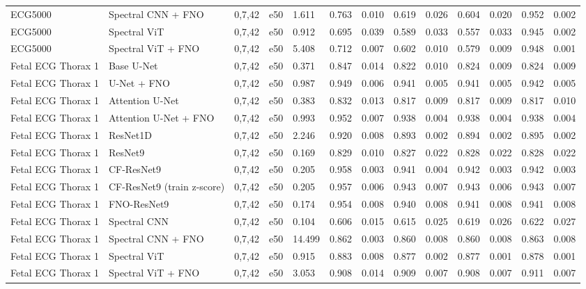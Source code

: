 \begin{longtable}{lllllllllllll}
ECG5000 & Spectral CNN + FNO & 0,7,42 & e50 & 1.611 & 0.763 & 0.010 & 0.619 & 0.026 & 0.604 & 0.020 & 0.952 & 0.002 \\
ECG5000 & Spectral ViT & 0,7,42 & e50 & 0.912 & 0.695 & 0.039 & 0.589 & 0.033 & 0.557 & 0.033 & 0.945 & 0.002 \\
ECG5000 & Spectral ViT + FNO & 0,7,42 & e50 & 5.408 & 0.712 & 0.007 & 0.602 & 0.010 & 0.579 & 0.009 & 0.948 & 0.001 \\
Fetal ECG Thorax 1 & Base U-Net & 0,7,42 & e50 & 0.371 & 0.847 & 0.014 & 0.822 & 0.010 & 0.824 & 0.009 & 0.824 & 0.009 \\
Fetal ECG Thorax 1 & U-Net + FNO & 0,7,42 & e50 & 0.987 & 0.949 & 0.006 & 0.941 & 0.005 & 0.941 & 0.005 & 0.942 & 0.005 \\
Fetal ECG Thorax 1 & Attention U-Net & 0,7,42 & e50 & 0.383 & 0.832 & 0.013 & 0.817 & 0.009 & 0.817 & 0.009 & 0.817 & 0.010 \\
Fetal ECG Thorax 1 & Attention U-Net + FNO & 0,7,42 & e50 & 0.993 & 0.952 & 0.007 & 0.938 & 0.004 & 0.938 & 0.004 & 0.938 & 0.004 \\
Fetal ECG Thorax 1 & ResNet1D & 0,7,42 & e50 & 2.246 & 0.920 & 0.008 & 0.893 & 0.002 & 0.894 & 0.002 & 0.895 & 0.002 \\
Fetal ECG Thorax 1 & ResNet9 & 0,7,42 & e50 & 0.169 & 0.829 & 0.010 & 0.827 & 0.022 & 0.828 & 0.022 & 0.828 & 0.022 \\
Fetal ECG Thorax 1 & CF-ResNet9 & 0,7,42 & e50 & 0.205 & 0.958 & 0.003 & 0.941 & 0.004 & 0.942 & 0.003 & 0.942 & 0.003 \\
Fetal ECG Thorax 1 & CF-ResNet9 (train z-score) & 0,7,42 & e50 & 0.205 & 0.957 & 0.006 & 0.943 & 0.007 & 0.943 & 0.006 & 0.943 & 0.007 \\
Fetal ECG Thorax 1 & FNO-ResNet9 & 0,7,42 & e50 & 0.174 & 0.954 & 0.008 & 0.940 & 0.008 & 0.941 & 0.008 & 0.941 & 0.008 \\
Fetal ECG Thorax 1 & Spectral CNN & 0,7,42 & e50 & 0.104 & 0.606 & 0.015 & 0.615 & 0.025 & 0.619 & 0.026 & 0.622 & 0.027 \\
Fetal ECG Thorax 1 & Spectral CNN + FNO & 0,7,42 & e50 & 14.499 & 0.862 & 0.003 & 0.860 & 0.008 & 0.860 & 0.008 & 0.863 & 0.008 \\
Fetal ECG Thorax 1 & Spectral ViT & 0,7,42 & e50 & 0.915 & 0.883 & 0.008 & 0.877 & 0.002 & 0.877 & 0.001 & 0.878 & 0.001 \\
Fetal ECG Thorax 1 & Spectral ViT + FNO & 0,7,42 & e50 & 3.053 & 0.908 & 0.014 & 0.909 & 0.007 & 0.908 & 0.007 & 0.911 & 0.007 \\

\end{longtable}
